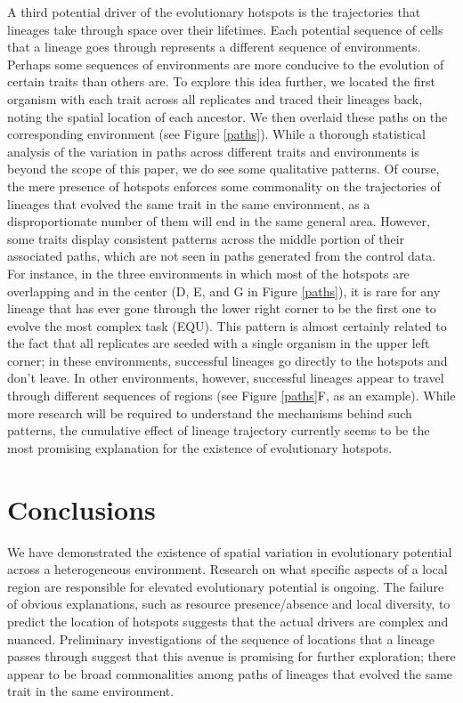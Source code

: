 A third potential driver of the evolutionary hotspots is the trajectories that lineages take through space over their lifetimes. Each potential sequence of cells that a lineage goes through represents a different sequence of environments. Perhaps some sequences of environments are more conducive to the evolution of certain traits than others are. To explore this idea further, we located the first organism with each trait across all replicates and traced their lineages back, noting the spatial location of each ancestor. We then overlaid these paths on the corresponding environment (see Figure \ref{paths}). While a thorough statistical analysis of the variation in paths across different traits and environments is beyond the scope of this paper, we do see some qualitative patterns. Of course, the mere presence of hotspots enforces some commonality on the trajectories of lineages that evolved the same trait in the same environment, as a disproportionate number of them will end in the same general area. However, some traits display consistent patterns across the middle portion of their associated paths, which are not seen in paths generated from the control data. For instance, in the three environments in which most of the hotspots are overlapping and in the center (D, E, and G in Figure \ref{paths}), it is rare for any lineage that has ever gone through the lower right corner to be the first one to evolve the most complex task (EQU). This pattern is almost certainly related to the fact that all replicates are seeded with a single organism in the upper left corner; in these environments, successful lineages go directly to the hotspots and don't leave. In other environments, however, successful lineages appear to travel through different sequences of regions (see Figure \ref{paths}F, as an example). While more research will be required to understand the mechanisms behind such patterns, the cumulative effect of lineage trajectory currently seems to be the most promising explanation for the existence of evolutionary hotspots.


\section{Conclusions}
    We have demonstrated the existence of spatial variation in evolutionary potential across a heterogeneous environment. Research on what specific aspects of a local region are responsible for elevated evolutionary potential is ongoing. The failure of obvious explanations, such as resource presence/absence and local diversity, to predict the location of hotspots suggests that the actual drivers are complex and nuanced. Preliminary investigations of the sequence of locations that a lineage passes through suggest that this avenue is promising for further exploration; there appear to be broad commonalities among paths of lineages that evolved the same trait in the same environment.
 
